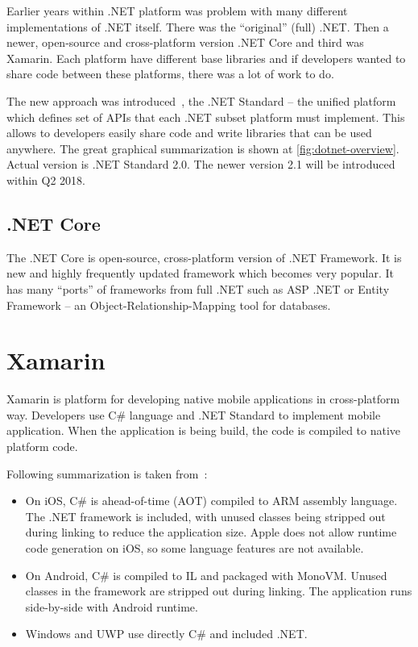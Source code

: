 Earlier years within .NET platform was problem with many different implementations of .NET itself. There was the ``original'' (full) .NET. Then a newer, open-source and cross-platform version .NET Core and third was Xamarin. Each platform have different base libraries and if developers wanted to share code between these platforms, there was a lot of work to do. 

The new approach was introduced~\cite{introducing-dotnet-standard}, the .NET Standard -- the unified platform which defines set of APIs that each .NET subset platform must implement. This allows to developers easily share code and write libraries that can be used anywhere. The great graphical summarization is shown at \cref{fig:dotnet-overview}. Actual version is .NET Standard 2.0. The newer version 2.1 will be introduced within Q2 2018. 
\subsection{.NET Core}
The .NET Core is open-source, cross-platform version of .NET Framework. It is new and highly frequently updated framework which becomes very popular. It has many ``ports'' of frameworks from full .NET such as ASP .NET or Entity Framework -- an Object-Relationship-Mapping tool for databases. 
\section{Xamarin}
Xamarin is platform for developing native mobile applications in cross-platform way. Developers use C\# language and .NET Standard to implement mobile application. When the application is being build, the code is compiled to native platform code. 

Following summarization is taken from~\cite{xamarin-understand-platform}:
\begin{itemize}
\item On iOS, C\# is ahead-of-time (AOT) compiled to ARM assembly language. The .NET framework is included, with unused classes being stripped out during linking to reduce the application size. Apple does not allow runtime code generation on iOS, so some language features are not available.
\item On Android, C\# is compiled to IL and packaged with MonoVM. Unused classes in the framework are stripped out during linking. The application runs side-by-side with Android runtime.
\item Windows and UWP use directly C\# and included .NET. 
\end{itemize}

